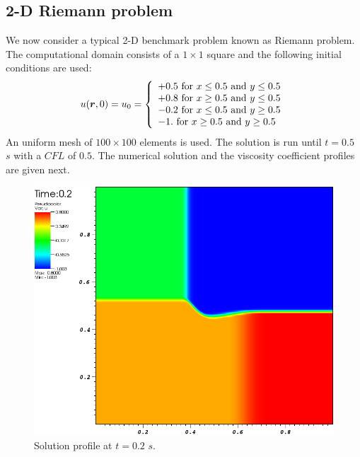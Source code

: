 \subsection{2-D Riemann problem}\label{sec:2dnum_sct2b}
We now consider a typical 2-D benchmark problem known as Riemann problem. The computational domain consists of a $1 \times 1$ square and the following initial conditions are used:
%
\begin{equation}\label{eq:bg_2d_ic_sct2b}
u(\boldsymbol r,0) = u_0 = \left\{
\begin{array}{l}
+0.5 \text{ for } x \leq 0.5 \text{ and } y \leq 0.5 \\
+0.8 \text{ for } x \geq 0.5 \text{ and } y \leq 0.5 \\
-0.2 \text{ for } x \leq 0.5 \text{ and } y \geq 0.5 \\
-1. \text{ for } x \geq 0.5 \text{ and } y \geq 0.5
\end{array}
\nonumber
\right.
\end{equation}
%
An uniform mesh of $100 \times 100$ elements is used. The solution is run until $t=0.5$ $s$ with a $CFL$ of $0.5$. The numerical solution and the viscosity coefficient profiles are given next. 
%
\begin{figure}[H]
	\centering
	\includegraphics[width=\textwidth]{figures/Burger2D_sol_t0p2.png}
	\caption{Solution profile at $t=0.2$ $s$.}
	\label{fig:2d_burger_sol_t0p2}
\end{figure}
